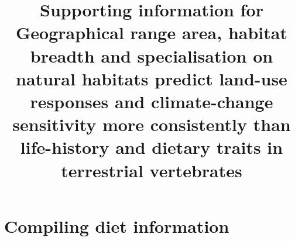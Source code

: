 \documentclass[11pt]{article}
\begin{document}
\title{\textbf{Supporting information for\\
\vspace{1cm}
Geographical range area, habitat breadth and specialisation on natural habitats predict land-use responses and climate-change sensitivity more consistently than life-history and dietary traits in terrestrial vertebrates   \vspace{2cm}}}


\maketitle
\clearpage

\section{Compiling diet information}

 
\end{document}
